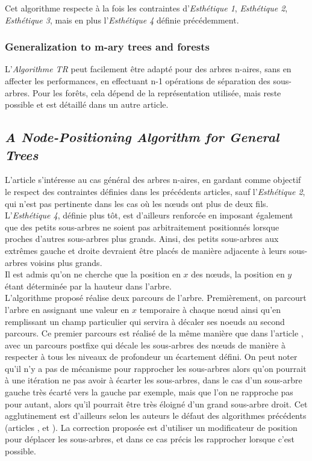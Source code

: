 \documentclass{article}
\begin{document}
  Cet algorithme respecte à la fois les contraintes d'\emph{Esthétique 1}, \emph{Esthétique 2}, \emph{Esthétique 3}, mais en plus l'\emph{Esthétique 4} définie précédemment.\\
  
  
  \subsubsection{Generalization to m-ary trees and forests}
  L'\emph{Algorithme TR} peut facilement être adapté pour des arbres n-aires, sans en affecter les performances, en effectuant n-1 opérations de séparation des sous-arbres.
  Pour les forêts, cela dépend de la représentation utilisée, mais reste possible et est détaillé dans un autre article.\\
  
  \subsection{\emph{A Node-Positioning Algorithm for General Trees}}
  
  L'article \cite{article90} s'intéresse au cas général des arbres n-aires, en gardant comme objectif le respect des contraintes définies dans les précédents articles, sauf l'\emph{Esthétique 2}, qui n'est pas pertinente dans les cas où les n\oe{}uds ont plus de deux fils.
  L'\emph{Esthétique 4}, définie plus tôt, est d'ailleurs renforcée en imposant également que des petits sous-arbres ne soient pas arbitraitement positionnés lorsque proches d'autres sous-arbres plus grands.
  Ainsi, des petits sous-arbres aux extrêmes gauche et droite devraient être placés de manière adjacente à leurs sous-arbres voisins plus grands.\\
  
  Il est admis qu'on ne cherche que la position en $x$ des n\oe{}uds, la position en $y$ étant déterminée par la hauteur dans l'arbre.\\
  
  L'algorithme proposé réalise deux parcours de l'arbre. Premièrement, on parcourt l'arbre en assignant une valeur en $x$ temporaire à chaque n\oe{}ud ainsi qu'en remplissant un champ particulier qui servira à décaler ses noeuds au second parcours. Ce premier parcours est réalisé de la même manière que dans l'article \cite{article81}, avec un parcours postfixe qui décale les sous-arbres des n\oe{}uds de manière à respecter à tous les niveaux de profondeur un écartement défini. On peut noter qu'il n'y a pas de mécanisme pour rapprocher les sous-arbres alors qu'on pourrait à une itération ne pas avoir à écarter les sous-arbres, dans le cas d'un sous-arbre gauche très écarté vers la gauche par exemple, mais que l'on ne rapproche pas pour autant, alors qu'il pourrait être très éloigné d'un grand sous-arbre droit. Cet agglutinement est d'ailleurs selon les auteurs le défaut des algorithmes précédents (articles \cite{article79}, et \cite{article81}).
  La correction proposée est d'utiliser un modificateur de position pour déplacer les sous-arbres, et dans ce cas précis les rapprocher lorsque c'est possible.\\
  
\end{document}
